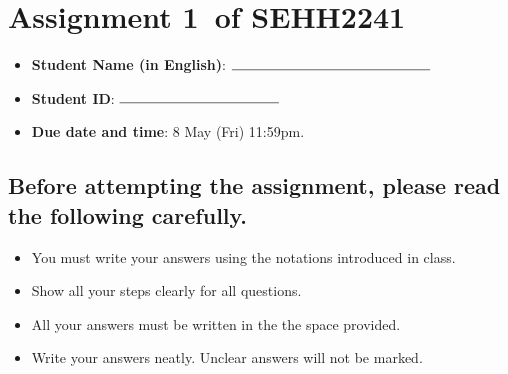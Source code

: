 \documentclass[11pt]{article}   %
\def \HW {Assignment 1}
\def \courseCode {SEHH2241}
\def \dueTime {8 May (Fri) 11:59pm}
\begin{document}
\section*{\HW ~of \courseCode}
\begin{itemize}
	\item \textbf{Student Name (in English)}: $\rule{5cm}{0.15mm}$
	\item\textbf{Student ID}: $\rule{4cm}{0.15mm}$
	\item \textbf{Due date and time}: \dueTime .
\end{itemize}
\subsection*{Before attempting the assignment, please read the following carefully.}
\begin{itemize}
\item You must write your answers using the notations introduced in class.
\item Show all your steps clearly for all questions. 
\item All your answers must be written in the the space provided.
\item Write your answers neatly. Unclear answers will not be marked.
\end{itemize}
\end{document}
